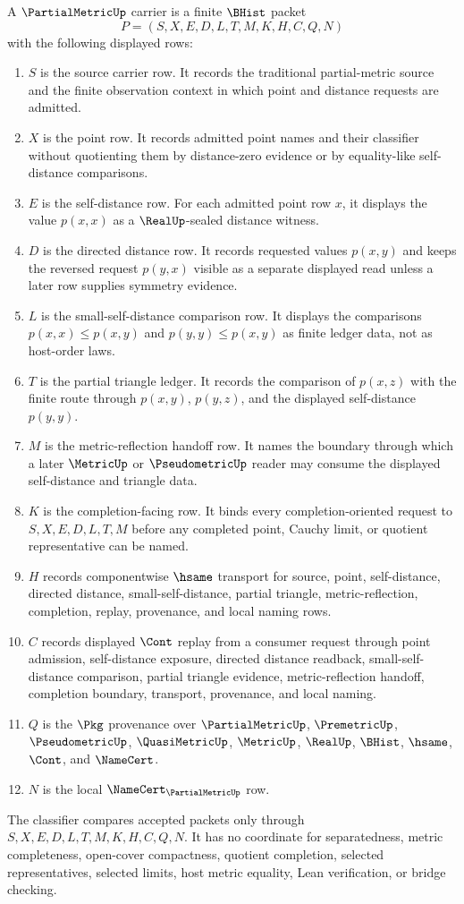 \begin{definition}
\label{def:partial-metric-carrier}
A $\PartialMetricUp$ carrier is a finite $\BHist$ packet
$$
P=(S,X,E,D,L,T,M,K,H,C,Q,N)
$$
with the following displayed rows:
\begin{enumerate}
\item $S$ is the source carrier row. It records the traditional partial-metric source and the finite observation context in which point and distance requests are admitted.
\item $X$ is the point row. It records admitted point names and their classifier without quotienting them by distance-zero evidence or by equality-like self-distance comparisons.
\item $E$ is the self-distance row. For each admitted point row $x$, it displays the value $p(x,x)$ as a $\RealUp$-sealed distance witness.
\item $D$ is the directed distance row. It records requested values $p(x,y)$ and keeps the reversed request $p(y,x)$ visible as a separate displayed read unless a later row supplies symmetry evidence.
\item $L$ is the small-self-distance comparison row. It displays the comparisons $p(x,x)\leq p(x,y)$ and $p(y,y)\leq p(x,y)$ as finite ledger data, not as host-order laws.
\item $T$ is the partial triangle ledger. It records the comparison of $p(x,z)$ with the finite route through $p(x,y)$, $p(y,z)$, and the displayed self-distance $p(y,y)$.
\item $M$ is the metric-reflection handoff row. It names the boundary through which a later $\MetricUp$ or $\PseudometricUp$ reader may consume the displayed self-distance and triangle data.
\item $K$ is the completion-facing row. It binds every completion-oriented request to $S,X,E,D,L,T,M$ before any completed point, Cauchy limit, or quotient representative can be named.
\item $H$ records componentwise $\hsame$ transport for source, point, self-distance, directed distance, small-self-distance, partial triangle, metric-reflection, completion, replay, provenance, and local naming rows.
\item $C$ records displayed $\Cont$ replay from a consumer request through point admission, self-distance exposure, directed distance readback, small-self-distance comparison, partial triangle evidence, metric-reflection handoff, completion boundary, transport, provenance, and local naming.
\item $Q$ is the $\Pkg$ provenance over $\PartialMetricUp$, $\PremetricUp$, $\PseudometricUp$, $\QuasiMetricUp$, $\MetricUp$, $\RealUp$, $\BHist$, $\hsame$, $\Cont$, and $\NameCert$.
\item $N$ is the local $\NameCert_{\PartialMetricUp}$ row.
\end{enumerate}
The classifier compares accepted packets only through $S,X,E,D,L,T,M,K,H,C,Q,N$. It has no coordinate for separatedness, metric completeness, open-cover compactness, quotient completion, selected representatives, selected limits, host metric equality, Lean verification, or bridge checking.
\end{definition}

